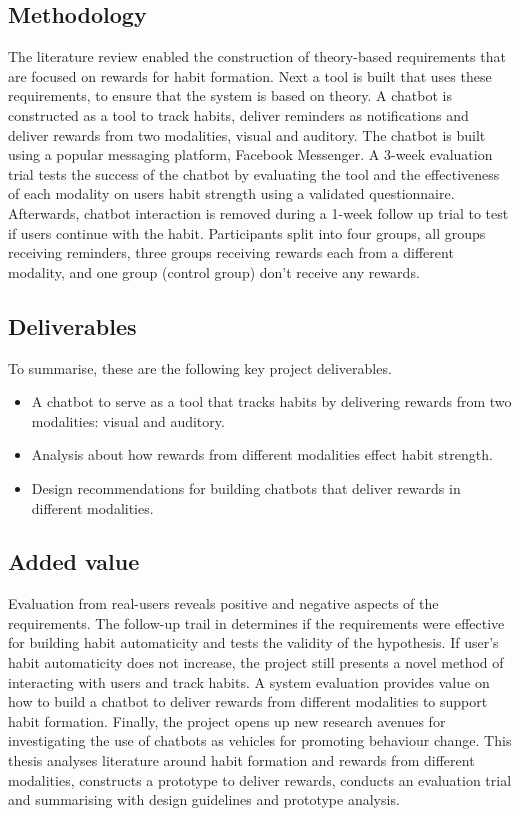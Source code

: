 \subsection*{Methodology}
The literature review enabled the construction of theory-based requirements that are focused on rewards for habit formation. Next a tool is built that uses these requirements, to ensure that the system is based on theory. A chatbot is constructed as a tool to track habits, deliver reminders as notifications and deliver rewards from two modalities, visual and auditory. The chatbot is built using a popular messaging platform, Facebook Messenger.\newline
\newline
A 3-week evaluation trial tests the success of the chatbot by evaluating the tool and the effectiveness of each modality on users habit strength using a validated questionnaire. Afterwards, chatbot interaction is removed during a 1-week follow up trial to test if users continue with the habit. Participants split into four groups, all groups receiving reminders, three groups receiving rewards each from a different modality, and one group (control group) don't receive any rewards.

\newpage
\subsection*{Deliverables}
To summarise, these are the following key project deliverables.

\begin{itemize}
  \item A chatbot to serve as a tool that tracks habits by delivering rewards from two modalities: visual and auditory.
  \item Analysis about how rewards from different modalities effect habit strength.
  \item Design recommendations for building chatbots that deliver rewards in different modalities.
\end{itemize}

\subsection*{Added value}
Evaluation from real-users reveals positive and negative aspects of the requirements. The follow-up trail in determines if the requirements were effective for building habit automaticity and tests the validity of the hypothesis. If user's habit automaticity does not increase, the project still presents a novel method of interacting with users and track habits. A system evaluation provides value on how to build a chatbot to deliver rewards from different modalities to support habit formation. Finally, the project opens up new research avenues for investigating the use of chatbots as vehicles for promoting behaviour change.\newline
\newline
This thesis analyses literature around habit formation and rewards from different modalities, constructs a prototype to deliver rewards, conducts an evaluation trial and summarising with design guidelines and prototype analysis.

\newpage
